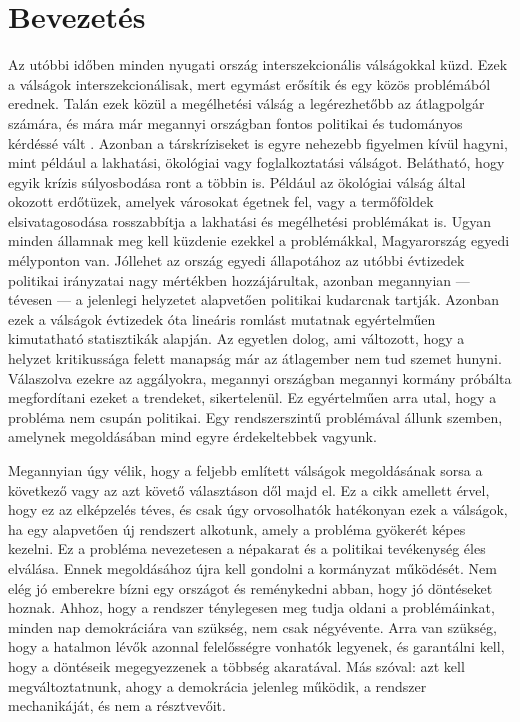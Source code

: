 \section{Bevezetés}

Az utóbbi időben minden nyugati ország interszekcionális válságokkal küzd. Ezek a
válságok interszekcionálisak, mert egymást erősítik és egy közös problémából
erednek. Talán ezek közül a megélhetési válság a legérezhetőbb az átlagpolgár
számára, és mára már megannyi országban fontos politikai és tudományos kérdéssé vált
\cite{cost_of_living_impact, cost_of_living_crisis, global_wage}. Azonban a társkríziseket
is egyre nehezebb figyelmen kívül hagyni, mint például a lakhatási, ökológiai vagy
foglalkoztatási válságot. Belátható, hogy egyik krízis súlyosbodása ront a többin
is. Például az ökológiai válság által okozott erdőtüzek, amelyek városokat égetnek fel,
vagy a termőföldek elsivatagosodása rosszabbítja a lakhatási és megélhetési problémákat
is.  Ugyan minden államnak meg kell küzdenie ezekkel a problémákkal, Magyarország egyedi
mélyponton van. Jóllehet az ország egyedi állapotához az utóbbi évtizedek politikai
irányzatai nagy mértékben hozzájárultak, azonban megannyian --- tévesen --- a jelenlegi
helyzetet alapvetően politikai kudarcnak tartják. Azonban ezek a válságok évtizedek óta
lineáris romlást mutatnak egyértelműen kimutatható statisztikák alapján. Az egyetlen
dolog, ami változott, hogy a helyzet kritikussága felett manapság már az átlagember nem
tud szemet hunyni. Válaszolva ezekre az aggályokra, megannyi országban megannyi kormány
próbálta megfordítani ezeket a trendeket, sikertelenül. Ez egyértelműen arra utal, hogy
a probléma nem csupán politikai. Egy rendszerszintű problémával állunk szemben, amelynek
megoldásában mind egyre érdekeltebbek vagyunk.

Megannyian úgy vélik, hogy a feljebb említett válságok megoldásának sorsa a következő
vagy az azt követő választáson dől majd el. Ez a cikk amellett érvel, hogy ez az elképzelés
téves, és csak úgy orvosolhatók hatékonyan ezek a válságok, ha egy alapvetően új rendszert
alkotunk, amely a probléma gyökerét képes kezelni.  Ez a probléma nevezetesen a népakarat és
a politikai tevékenység éles elválása. Ennek megoldásához újra kell gondolni a kormányzat
működését. Nem elég jó emberekre bízni egy országot és reménykedni abban, hogy jó
döntéseket hoznak. Ahhoz, hogy a rendszer ténylegesen meg tudja oldani a problémáinkat,
minden nap demokráciára van szükség, nem csak négyévente. Arra van szükség, hogy
a hatalmon lévők azonnal felelősségre vonhatók legyenek, és garantálni kell, hogy a
döntéseik megegyezzenek a többség akaratával. Más szóval: azt kell megváltoztatnunk,
ahogy a demokrácia jelenleg működik, a rendszer mechanikáját, és nem a résztvevőit.

